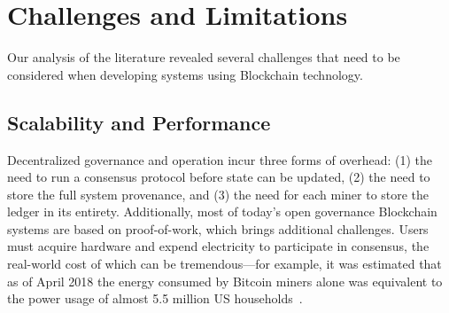 \section{Challenges and Limitations}
\label{sec:challenges}

Our analysis of the literature revealed several challenges that need to be considered when developing systems using Blockchain technology.

\subsection{Scalability and Performance}
Decentralized governance and operation incur three forms of overhead: (1) the 
need to run a consensus protocol before state can be updated, (2) the need to 
store the full system provenance, and (3) the need for each miner to store the 
ledger in its entirety. %
Additionally, most of today's open governance Blockchain systems are based on 
proof-of-work, which brings additional challenges.
Users must acquire hardware and expend electricity to participate in consensus, 
the real-world cost of which can be tremendous---for example, it was estimated 
that as of April 2018 the energy consumed by Bitcoin miners alone was 
equivalent to the power usage of almost 5.5 million US 
households~\cite{Digiconomist}.


